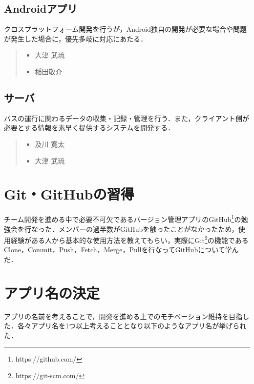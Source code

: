 \subsection{Androidアプリ}
クロスプラットフォーム開発を行うが，Android独自の開発が必要な場合や問題が発生した場合に，優先多岐に対応にあたる．
\begin{quote}
    \begin{itemize}
        \item 大津 武琉
        \item 稲田敬介
    \end{itemize}
\end{quote}

\subsection{サーバ}
バスの運行に関わるデータの収集・記録・管理を行う．また，クライアント側が必要とする情報を素早く提供するシステムを開発する．
\begin{quote}
    \begin{itemize}
        \item 及川 寛太
        \item 大津 武琉
    \end{itemize}
\end{quote}

\section{Git・GitHubの習得}
チーム開発を進める中で必要不可欠であるバージョン管理アプリのGitHub\footnote{https://github.com/}の勉強会を行なった．メンバーの過半数がGitHubを触ったことがなかったため，使用経験がある人から基本的な使用方法を教えてもらい，実際にGit\footnote{https://git-scm.com/}の機能であるClone，Commit，Push，Fetch，Merge，Pullを行なってGitHubについて学んだ．

\section{アプリ名の決定}
アプリの名前を考えることで，開発を進める上でのモチベーション維持を目指した．各々アプリ名を1つ以上考えることとなり以下のようなアプリ名が挙げられた．


